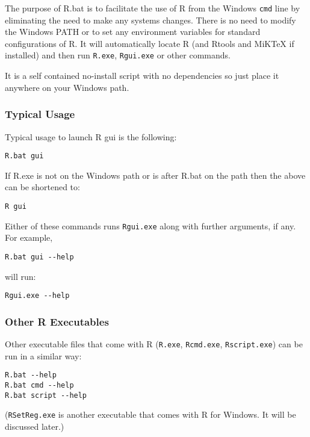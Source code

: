 The purpose of R.bat is to facilitate the use of R from the Windows
\texttt{cmd} line by eliminating the need to make any systems changes.
There is no need to modify the Windows PATH or to set any environment
variables for standard configurations of R. It will automatically locate
R (and Rtools and MiKTeX if installed) and then run \texttt{R.exe},
\texttt{Rgui.exe} or other commands.

It is a self contained no-install script with no dependencies so just
place it anywhere on your Windows path.

\subsubsection{Typical Usage}

Typical usage to launch R gui is the following:

\begin{verbatim}
R.bat gui
\end{verbatim}

If R.exe is not on the Windows path or is after R.bat on the path then
the above can be shortened to:

\begin{verbatim}
R gui
\end{verbatim}

Either of these commands runs \texttt{Rgui.exe} along with further
arguments, if any. For example,

\begin{verbatim}
R.bat gui --help
\end{verbatim}

will run:

\begin{verbatim}
Rgui.exe --help
\end{verbatim}

\subsubsection{Other R Executables}

Other executable files that come with R (\texttt{R.exe},
\texttt{Rcmd.exe}, \texttt{Rscript.exe}) can be run in a similar way:

\begin{verbatim}
R.bat --help
R.bat cmd --help
R.bat script --help
\end{verbatim}

(\texttt{RSetReg.exe} is another executable that comes with R for
Windows. It will be discussed later.)

